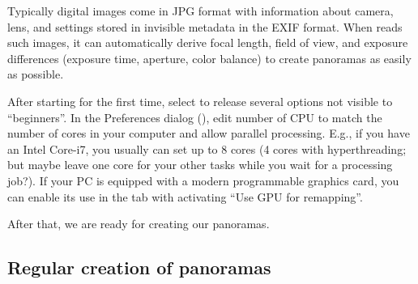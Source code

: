 Typically digital images come in JPG format with information about
camera, lens, and settings stored in invisible metadata in the EXIF
format. When  reads such images, it can automatically derive
focal length, field of view, and exposure differences (exposure time,
aperture, color balance) to create panoramas as easily as
possible.

After starting  for the first time, select  to release several
options not visible to ``beginners''.  In the Preferences dialog
(), edit number of CPU to match the number of
cores in your computer and allow parallel processing. E.g., if you
have an Intel Core-i7, you usually can set up to 8 cores (4 cores with
hyperthreading; but maybe leave one core for your other tasks while
you wait for a processing job?).  If your PC is equipped with a
modern programmable graphics card, you can enable its use in the  tab
with activating ``Use GPU for remapping''.

After that, we are ready for creating our panoramas.


\subsection{Regular creation of panoramas}
\label{sec:landscapes:Hugin:regular}

